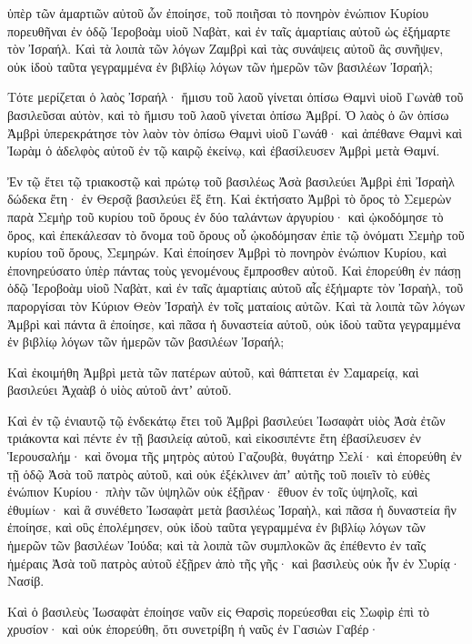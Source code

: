 {ὑπὲρ τῶν ἁμαρτιῶν αὐτοῦ ὧν ἐποίησε, τοῦ ποιῆσαι τὸ πονηρὸν ἐνώπιον Κυρίου πορευθῆναι ἐν ὁδῷ Ἱεροβοὰμ υἱοῦ Ναβὰτ, καὶ ἐν ταῖς ἁμαρτίαις αὐτοῦ ὡς ἐξήμαρτε τὸν Ἰσραήλ.
Καὶ τὰ λοιπὰ τῶν λόγων Ζαμβρὶ καὶ τὰς συνάψεις αὐτοῦ ἃς συνῆψεν, οὐκ ἰδοὺ ταῦτα γεγραμμένα ἐν βιβλίῳ λόγων τῶν ἡμερῶν τῶν βασιλέων Ἰσραήλ;
\par }{\PP {}Τότε μερίζεται ὁ λαὸς Ἰσραήλ· ἥμισυ τοῦ λαοῦ γίνεται ὀπίσω Θαμνὶ υἱοῦ Γωνὰθ τοῦ βασιλεῦσαι αὐτὸν, καὶ τὸ ἥμισυ τοῦ λαοῦ γίνεται ὀπίσω Ἀμβρί.
Ὁ λαὸς ὁ ὢν ὀπίσω Ἀμβρὶ ὑπερεκράτησε τὸν λαὸν τὸν ὀπίσω Θαμνὶ υἱοῦ Γωνάθ· καὶ ἀπέθανε Θαμνὶ καὶ Ἰωρὰμ ὁ ἀδελφὸς αὐτοῦ ἐν τῷ καιρῷ ἐκείνῳ, καὶ ἐβασίλευσεν Ἀμβρὶ μετὰ Θαμνί.
\par }{\PP {}Ἐν τῷ ἔτει τῷ τριακοστῷ καὶ πρώτῳ τοῦ βασιλέως Ἀσὰ βασιλεύει Ἀμβρὶ ἐπὶ Ἰσραὴλ δώδεκα ἔτη· ἐν Θερσᾷ βασιλεύει ἓξ ἔτη.
Καὶ ἐκτήσατο Ἀμβρὶ τὸ ὄρος τὸ Σεμερὼν παρὰ Σεμὴρ τοῦ κυρίου τοῦ ὄρους ἐν δύο ταλάντων ἀργυρίου· καὶ ᾠκοδόμησε τὸ ὄρος, καὶ ἐπεκάλεσαν τὸ ὄνομα τοῦ ὄρους οὗ ᾠκοδόμησαν ἐπὶε τῷ ὀνόματι Σεμὴρ τοῦ κυρίου τοῦ ὄρους, Σεμηρών.
Καὶ ἐποίησεν Ἀμβρὶ τὸ πονηρὸν ἐνώπιον Κυρίου, καὶ ἐπονηρεύσατο ὑπὲρ πάντας τοὺς γενομένους ἔμπροσθεν αὐτοῦ.
Καὶ ἐπορεύθη ἐν πάσῃ ὁδῷ Ἱεροβοὰμ υἱοῦ Ναβὰτ, καὶ ἐν ταῖς ἁμαρτίαις αὐτοῦ αἷς ἐξήμαρτε τὸν Ἰσραὴλ, τοῦ παροργίσαι τὸν Κύριον Θεὸν Ἰσραὴλ ἐν τοῖς ματαίοις αὐτῶν.
Καὶ τὰ λοιπὰ τῶν λόγων Ἀμβρὶ καὶ πάντα ἃ ἐποίησε, καὶ πᾶσα ἡ δυναστεία αὐτοῦ, οὐκ ἰδοὺ ταῦτα γεγραμμένα ἐν βιβλίῳ λόγων τῶν ἡμερῶν τῶν βασιλέων Ἰσραήλ;
\par }{\PP {}Καὶ ἐκοιμήθη Ἀμβρὶ μετὰ τῶν πατέρων αὐτοῦ, καὶ θάπτεται ἐν Σαμαρείᾳ, καὶ βασιλεύει Ἀχαὰβ ὁ υἱὸς αὐτοῦ ἀντʼ αὐτοῦ.
\par }{\PP {}Καὶ ἐν τῷ ἐνιαυτῷ τῷ ἑνδεκάτῳ ἔτει τοῦ Ἀμβρὶ βασιλεύει Ἰωσαφὰτ υἱὸς Ἀσὰ ἐτῶν τριάκοντα καὶ πέντε ἐν τῇ βασιλείᾳ αὐτοῦ, καὶ εἰκοσιπέντε ἔτη ἐβασίλευσεν ἐν Ἱερουσαλήμ· καὶ ὄνομα τῆς μητρὸς αὐτοὐ Γαζουβὰ, θυγάτηρ Σελί·
καὶ ἐπορεύθη ἐν τῇ ὁδῷ Ἀσὰ τοῦ πατρὸς αὐτοῦ, καὶ οὐκ ἐξέκλινεν ἀπʼ αὐτῆς τοῦ ποιεῖν τὸ εὐθὲς ἐνώπιον Κυρίου· πλὴν τῶν ὑψηλῶν οὐκ ἐξῇραν· ἔθυον ἐν τοῖς ὑψηλοῖς, καὶ ἐθυμίων·
καὶ ἃ συνέθετο Ἰωσαφὰτ μετὰ βασιλέως Ἰσραὴλ, καὶ πᾶσα ἡ δυναστεία ἣν ἐποίησε, καὶ οὓς ἐπολέμησεν, οὐκ ἰδοὺ ταῦτα γεγραμμένα ἐν βιβλίῳ λόγων τῶν ἡμερῶν τῶν βασιλέων Ἰούδα;
καὶ τὰ λοιπὰ τῶν συμπλοκῶν ἃς ἐπέθεντο ἐν ταῖς ἡμέραις Ἀσὰ τοῦ πατρὸς αὐτοῦ ἐξῇρεν ἀπὸ τῆς γῆς·
καὶ βασιλεὺς οὐκ ἦν ἐν Συρίᾳ· Νασίβ.
\par }{\PP {}Καὶ ὁ βασιλεὺς Ἰωσαφὰτ ἐποίησε ναῦν εἰς Θαρσὶς πορεύεσθαι εἰς Σωφὶρ ἐπὶ τὸ χρυσίον· καὶ οὐκ ἐπορεύθη, ὅτι συνετρίβη ἡ ναῦς ἐν Γασιὼν Γαβέρ·
}
